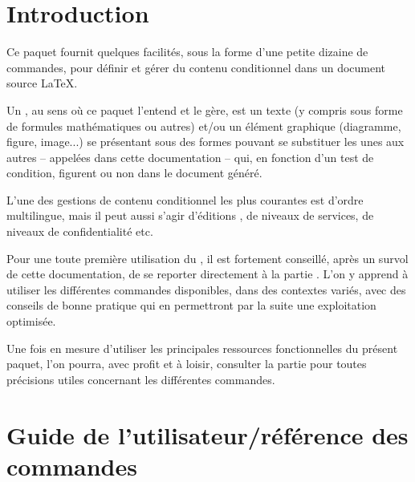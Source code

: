 \documentclass{article}
\newcommand\Latex{\LaTeX\xspace} %
\begin{document}
\title{}
\author{Jean-Louis Brabant}
\date{Version 1.5 du 1 juin 2020}
\maketitle

\begin{abstract}
Ce paquet permet de définir et gérer du contenu conditionnel (multilingue ou autre) dans un document source \LaTeX, sous la forme de commandes d'emploi aisé, et selon un paramétrage minimal.
\end{abstract}

\setcounter{tocdepth}{2}
\tableofcontents

\part*{Introduction}
Ce paquet fournit quelques facilités, sous la forme d'une petite dizaine de commandes, pour définir et gérer du contenu conditionnel dans un document source \Latex.

Un , au sens où ce paquet l'entend et le gère, est un texte (y compris sous forme de formules mathématiques ou autres) et/ou un élément graphique (diagramme, figure, image...) se présentant sous des formes pouvant se substituer les unes aux autres -- appelées  dans cette documentation -- qui, en fonction d'un test de condition, figurent ou non dans le document généré.

L'une des gestions de contenu conditionnel les plus courantes est d'ordre multilingue, mais il peut aussi s'agir d'éditions , de niveaux de services, de niveaux de confidentialité etc.

Pour une toute première utilisation du , il est fortement conseillé, après un survol de cette documentation, de se reporter directement à la partie . L'on y apprend à utiliser les différentes commandes disponibles, dans des contextes variés, avec des conseils de bonne pratique qui en permettront par la suite une exploitation optimisée.

Une fois en mesure d'utiliser les principales ressources fonctionnelles du présent paquet, l'on pourra, avec profit et à loisir, consulter la partie  pour toutes précisions utiles concernant les différentes commandes.

\part{Guide de l'utilisateur/référence des commandes}\label{CtDoc_Commandes}
\end{document}
